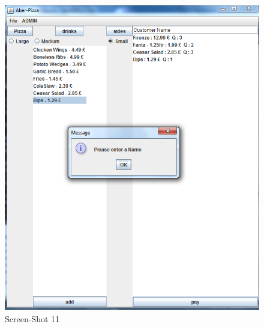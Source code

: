 \documentclass[11pt,a4paper]{article}
\begin{document}
\begin{flushleft}
\begin{figure}[ht]
	\centering
 	\includegraphics[scale = 0.4]{../Sceenshots/Capture10.PNG} 
	\caption{Screen-Shot 11}
\end{figure}



\end{flushleft}
\end{document}
